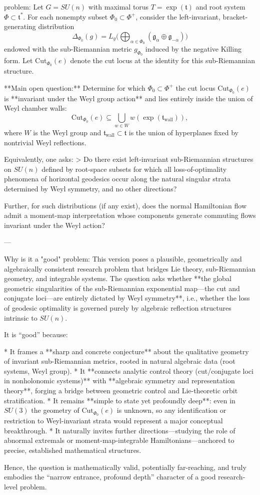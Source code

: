problem:  
Let \( G = SU(n) \) with maximal torus \( T = \exp(\mathfrak{t}) \) and root system \( \Phi \subset \mathfrak{t}^* \).  
For each nonempty subset \( \Phi_0 \subset \Phi^+ \), consider the left-invariant, bracket-generating distribution  
\[
\Delta_{\Phi_0}(g) = L_g\Big( \bigoplus_{\alpha \in \Phi_0} (\mathfrak{g}_\alpha \oplus \mathfrak{g}_{-\alpha}) \Big)
\]
endowed with the sub-Riemannian metric \(g_{\Phi_0}\) induced by the negative Killing form.  
Let \(\mathrm{Cut}_{\Phi_0}(e)\) denote the cut locus at the identity for this sub-Riemannian structure.

**Main open question:**  
Determine for which \( \Phi_0 \subset \Phi^+ \) the cut locus \( \mathrm{Cut}_{\Phi_0}(e) \) is **invariant under the Weyl group action** and lies entirely inside the union of Weyl chamber walls:
\[
\mathrm{Cut}_{\Phi_0}(e) \subseteq \bigcup_{w \in W} w(\exp(\mathfrak{t}_\mathrm{wall})),
\]
where \(W\) is the Weyl group and \(\mathfrak{t}_\mathrm{wall}\subset \mathfrak{t}\) is the union of hyperplanes fixed by nontrivial Weyl reflections.  

Equivalently, one asks:  
> Do there exist left-invariant sub-Riemannian structures on \(SU(n)\) defined by root-space subsets for which all loss-of-optimality phenomena of horizontal geodesics occur along the natural singular strata determined by Weyl symmetry, and no other directions?

Further, for such distributions (if any exist), does the normal Hamiltonian flow admit a moment-map interpretation whose components generate commuting flows invariant under the Weyl action?

---

Why is it a "good" problem:  
This version poses a plausible, geometrically and algebraically consistent research problem that bridges Lie theory, sub-Riemannian geometry, and integrable systems. The question asks whether **the global geometric singularities of the sub-Riemannian exponential map––the cut and conjugate loci––are entirely dictated by Weyl symmetry**, i.e., whether the loss of geodesic optimality is governed purely by algebraic reflection structures intrinsic to \(SU(n)\).  

It is “good” because:

* It frames a **sharp and concrete conjecture** about the qualitative geometry of invariant sub-Riemannian metrics, rooted in natural algebraic data (root systems, Weyl group).
* It **connects analytic control theory (cut/conjugate loci in nonholonomic systems)** with **algebraic symmetry and representation theory**, forging a bridge between geometric control and Lie-theoretic orbit stratification.
* It remains **simple to state yet profoundly deep**: even in \(SU(3)\) the geometry of \(\mathrm{Cut}_{\Phi_0}(e)\) is unknown, so any identification or restriction to Weyl-invariant strata would represent a major conceptual breakthrough.  
* It naturally invites further directions—studying the role of abnormal extremals or moment-map-integrable Hamiltonians—anchored to precise, established mathematical structures.

Hence, the question is mathematically valid, potentially far-reaching, and truly embodies the “narrow entrance, profound depth” character of a good research-level problem.